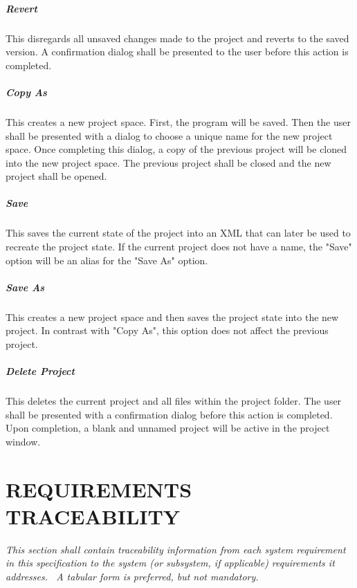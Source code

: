 \documentclass[twoside,letterpaper]{article}
\begin{document}
\subparagraph{Revert}
{\color{black}
This disregards all unsaved changes made to the project and reverts to the saved version. A confirmation dialog shall be presented to the user before this action is completed.}

\subparagraph{Copy As}
{\color{black}
This creates a new project space. First, the program will be saved. Then the user shall be presented with a dialog to choose a unique name for the new project space. Once completing this dialog, a copy of the previous project will be cloned into the new project space. The previous project shall be closed and the new project shall be opened.}

\subparagraph{Save}
{\color{black}
This saves the current state of the project into an XML that can later be used to recreate the project state. If the current project does not have a name, the "Save" option will be an alias for the "Save As" option.}

\subparagraph{Save As}
{\color{black}
This creates a new project space and then saves the project state into the new project. In contrast with "Copy As", this option does not affect the previous project. }

\subparagraph{Delete Project}
{\color{black}
This deletes the current project and all files within the project folder. The user shall be presented with a confirmation dialog before this action is completed. Upon completion, a blank and unnamed project will be active in the project window. }









\clearpage\setcounter{page}{1}\pagestyle{Convertvi}
\section[REQUIREMENTS TRACEABILITY]{\rmfamily\bfseries\color{black}
REQUIREMENTS TRACEABILITY}
{\itshape\color{black}
This section shall contain traceability information from each system
requirement in this specification to the system (or subsystem, if
applicable) requirements it addresses. \ A tabular form is preferred,
but not mandatory.}


\bigskip
\end{document}
